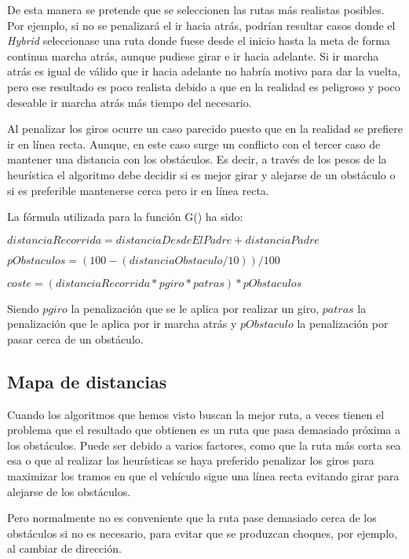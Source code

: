 De esta manera se pretende que se seleccionen las rutas más realistas posibles. Por ejemplo, si no se penalizará el ir hacia atrás, podrían resultar casos donde el \textit{Hybrid \Astar} seleccionase una ruta donde fuese desde el inicio hasta la meta de forma continua marcha atrás, aunque pudiese girar e ir hacia adelante. Si ir marcha atrás es igual de válido que ir hacia adelante no habría motivo para dar la vuelta, pero ese resultado es poco realista debido a que en la realidad es peligroso y poco deseable ir marcha atrás más tiempo del necesario.

Al penalizar los giros ocurre un caso parecido puesto que en la realidad se prefiere ir en línea recta. Aunque, en este caso surge un conflicto con el tercer caso de mantener una distancia con los obstáculos. Es decir, a través de los pesos de la heurística el algoritmo debe decidir si es mejor girar y alejarse de un obstáculo o si es preferible mantenerse cerca pero ir en línea recta.

La fórmula utilizada para la función G() ha sido:
\begin{center}
$distanciaRecorrida = distanciaDesdeElPadre + distanciaPadre$

$pObstaculos = (100-(distanciaObstaculo/10))/100$

$coste = (distanciaRecorrida * pgiro * patras) * pObstaculos$
\end{center}

Siendo $pgiro$ la penalización que se le aplica por realizar un giro, $patras$ la penalización que le aplica por ir marcha atrás y $pObstaculo$ la penalización por pasar cerca de un obstáculo.

\subsection{Mapa de distancias} \label{mapadistancias}
Cuando los algoritmos que hemos visto buscan la mejor ruta, a veces tienen el problema que el resultado que obtienen es un ruta que pasa demasiado próxima a los obstáculos. Puede ser debido a varios factores, como que la ruta más corta sea esa o que al realizar las heurísticas se haya preferido penalizar los giros para maximizar los tramos en que el vehículo sigue una línea recta evitando girar para alejarse de los obstáculos.

Pero normalmente no es conveniente que la ruta pase demasiado cerca de los obstáculos si no es necesario, para evitar que se produzcan choques, por ejemplo, al cambiar de dirección.

